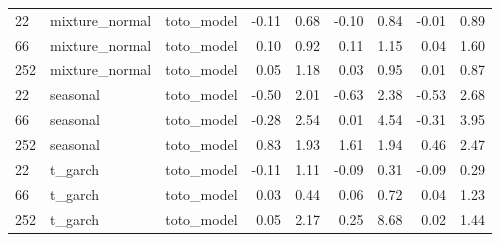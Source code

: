{\begin{tabular}{lllrrrrrr}
\midrule
22 & mixture\_normal & toto\_model & -0.11 & 0.68 & -0.10 & 0.84 & -0.01 & 0.89 \\
66 & mixture\_normal & toto\_model & 0.10 & 0.92 & 0.11 & 1.15 & 0.04 & 1.60 \\
252 & mixture\_normal & toto\_model & 0.05 & 1.18 & 0.03 & 0.95 & 0.01 & 0.87 \\
\midrule
22 & seasonal & toto\_model & -0.50 & 2.01 & -0.63 & 2.38 & -0.53 & 2.68 \\
66 & seasonal & toto\_model & -0.28 & 2.54 & 0.01 & 4.54 & -0.31 & 3.95 \\
252 & seasonal & toto\_model & 0.83 & 1.93 & 1.61 & 1.94 & 0.46 & 2.47 \\
\midrule
22 & t\_garch & toto\_model & -0.11 & 1.11 & -0.09 & 0.31 & -0.09 & 0.29 \\
66 & t\_garch & toto\_model & 0.03 & 0.44 & 0.06 & 0.72 & 0.04 & 1.23 \\
252 & t\_garch & toto\_model & 0.05 & 2.17 & 0.25 & 8.68 & 0.02 & 1.44 \\
\bottomrule
\end{tabular}
}